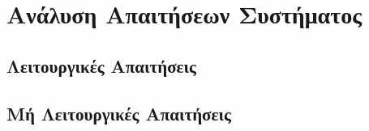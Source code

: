 \chapter{Ανάλυση Απαιτήσεων Συστήματος}

\section{Λειτουργικές Απαιτήσεις}
\section{Μή Λειτουργικές Απαιτήσεις}
